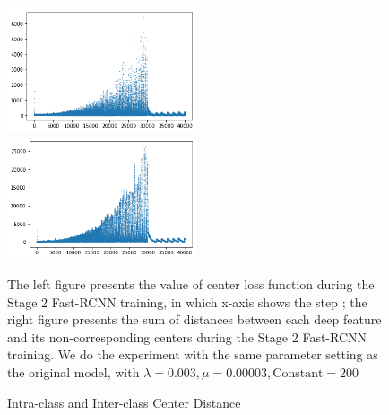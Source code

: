 \documentclass[a4paper]{article}
\begin{document}
\begin{figure}[H]
\centering
\begin{minipage}{\textwidth} %
\includegraphics[width=0.5\textwidth]{center_l2.png}
\includegraphics[width=0.5\textwidth]{sum_of_dot_1.png}\\
\footnotesize{The left figure presents the value of center loss function during the Stage $2$ Fast-RCNN training, in which x-axis shows the step ; the right figure presents the sum of distances between each deep feature and its non-corresponding centers during the Stage $2$ Fast-RCNN training. We do the experiment with the same parameter setting as the original model, with $\lambda = 0.003, \mu = 0.00003, \text{Constant} = 200$ \par}
\end{minipage}
\caption{Intra-class and Inter-class Center Distance}
\label{fig:contrasive_1}
\end{figure}
\end{document}
